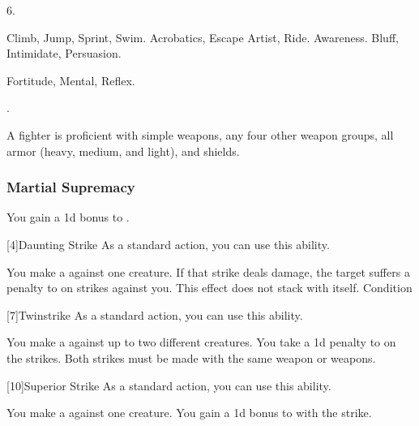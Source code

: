          6.

         Climb, Jump, Sprint, Swim.
         Acrobatics, Escape Artist, Ride.
         Awareness.
         Bluff, Intimidate, Persuasion.

          Fortitude,  Mental,  Reflex.

         .

        A fighter is proficient with simple weapons, any four other weapon groups,  all armor (heavy, medium, and light), and shields.


        \subsubsection{Martial Supremacy}
             You gain a \plus1d bonus to .

            [4]{Daunting Strike} As a standard action, you can use this ability.
            \begin{ability}
                \begin{spelleffects}
                    \spelleffect You make a  against one creature.
                    If that strike deals damage, the target suffers a  penalty to  on strikes against you.
                    This effect does not stack with itself.
                    \spelldur Condition
                \end{spelleffects}
            \end{ability}

            [7]{Twinstrike} As a standard action, you can use this ability.
            \begin{ability}
                \begin{spelleffects}
                    \spelleffect You make a  against up to two different creatures.
                    You take a \minus1d penalty to  on the strikes.
                    Both strikes must be made with the same weapon or weapons.
                \end{spelleffects}
            \end{ability}

            [10]{Superior Strike} As a standard action, you can use this ability.
            \begin{ability}
                \begin{spelleffects}
                    \spelleffect You make a  against one creature.
                    You gain a \plus1d bonus to  with the strike.
                \end{spelleffects}
            \end{ability}

